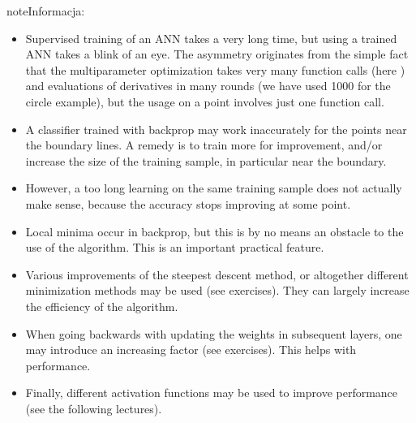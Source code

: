 \documentclass[a4paper,12pt,polish]{jupyterBook}
\begin{document}
\begin{sphinxadmonition}{note}{Informacja:}\begin{itemize}
\item {} 
\sphinxAtStartPar
Supervised training of an ANN takes a very long time, but using a trained ANN takes a blink of an eye. The asymmetry originates from the simple fact that the multi\sphinxhyphen{}parameter optimization takes very many function calls (here ) and evaluations of derivatives in many rounds (we have used 1000 for the circle example), but the usage on a point involves just one function call.

\item {} 
\sphinxAtStartPar
A classifier trained with backprop may work inaccurately for the points near the boundary lines. A remedy is to train more for improvement, and/or increase the
size of the training sample, in particular near the boundary.

\item {} 
\sphinxAtStartPar
However, a too long learning on the same training sample does not actually make sense, because the accuracy stops improving at some point.

\item {} 
\sphinxAtStartPar
Local minima occur in backprop, but this is by no means an obstacle to the use of the algorithm. This is an important practical feature.

\item {} 
\sphinxAtStartPar
Various improvements of the steepest descent method, or altogether different minimization methods may be used (see exercises). They can largely increase the efficiency of the algorithm.

\item {} 
\sphinxAtStartPar
When going backwards with updating the weights in subsequent layers, one may introduce an increasing factor (see exercises). This helps with performance.

\item {} 
\sphinxAtStartPar
Finally, different activation functions may be used to improve performance (see the following lectures).

\end{itemize}
\end{sphinxadmonition}
\end{document}
